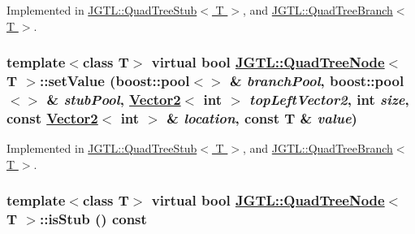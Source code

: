 Implemented in \hyperlink{class_j_g_t_l_1_1_quad_tree_stub_48f2d4a15b1b8b850b9d446fe972f561}{JGTL::Quad\-Tree\-Stub$<$ T $>$}, and \hyperlink{class_j_g_t_l_1_1_quad_tree_branch_131c37ee0dc66949927c62f9b438816d}{JGTL::Quad\-Tree\-Branch$<$ T $>$}.\hypertarget{class_j_g_t_l_1_1_quad_tree_node_8bf383a824c1b5dc7dc2fff05aeaaec9}{
\subsubsection[setValue]{\setlength{\rightskip}{0pt plus 5cm}template$<$class T$>$ virtual bool \hyperlink{class_j_g_t_l_1_1_quad_tree_node}{JGTL::Quad\-Tree\-Node}$<$ T $>$::set\-Value (boost::pool$<$$>$ \& {\em branch\-Pool}, boost::pool$<$$>$ \& {\em stub\-Pool}, \hyperlink{class_j_g_t_l_1_1_vector2}{Vector2}$<$ int $>$ {\em top\-Left\-Vector2}, int {\em size}, const \hyperlink{class_j_g_t_l_1_1_vector2}{Vector2}$<$ int $>$ \& {\em location}, const T \& {\em value})}}
\label{class_j_g_t_l_1_1_quad_tree_node_8bf383a824c1b5dc7dc2fff05aeaaec9}




Implemented in \hyperlink{class_j_g_t_l_1_1_quad_tree_stub_a89e27cf98e753df813770d7007b7a9b}{JGTL::Quad\-Tree\-Stub$<$ T $>$}, and \hyperlink{class_j_g_t_l_1_1_quad_tree_branch_82dcced1ba01d374ce25b8d67b27302c}{JGTL::Quad\-Tree\-Branch$<$ T $>$}.\hypertarget{class_j_g_t_l_1_1_quad_tree_node_bdc8677d8f2d61e8e7bbe31922b1899f}{
\subsubsection[isStub]{\setlength{\rightskip}{0pt plus 5cm}template$<$class T$>$ virtual bool \hyperlink{class_j_g_t_l_1_1_quad_tree_node}{JGTL::Quad\-Tree\-Node}$<$ T $>$::is\-Stub () const}}
\label{class_j_g_t_l_1_1_quad_tree_node_bdc8677d8f2d61e8e7bbe31922b1899f}




